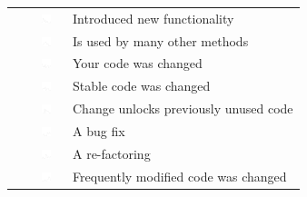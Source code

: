 \begin{table}[t!]
\begin{tabular}{rll}
&\vspace{-2pt}\includegraphics[height=10px, width=30px]{figures/sparkles/change-introduced-new-functionality.pdf} & Introduced new functionality\\
&\vspace{-2pt}\includegraphics[height=10px, width=30px]{figures/sparkles/code-is-used-by-many-other-methods.pdf} & Is used by many other methods\\
&\vspace{-2pt}\includegraphics[height=10px, width=30px]{figures/sparkles/your-code-was-changed.pdf} & Your code was changed \\
&\vspace{-2pt}\includegraphics[height=10px, width=30px]{figures/sparkles/stable-code-was-changed.pdf} & Stable code was changed\\
&\vspace{-2pt}\includegraphics[height=10px, width=30px]{figures/sparkles/change-unlocks-previously-unused-code.pdf} & Change unlocks previously unused code\\\
&\vspace{-2pt}\includegraphics[height=10px, width=30px]{figures/sparkles/change-was-a-bug-fix.pdf} & A bug fix\\	
&\vspace{-2pt}\includegraphics[height=10px, width=30px]{figures/sparkles/change-was-a-re-factoring.pdf} & A re-factoring\\ 
&\vspace{-2pt}\includegraphics[height=10px, width=30px]{figures/sparkles/frequently-modified-code-was-changed.pdf} & Frequently modified code was changed \\

\end{tabular}
\end{table}
